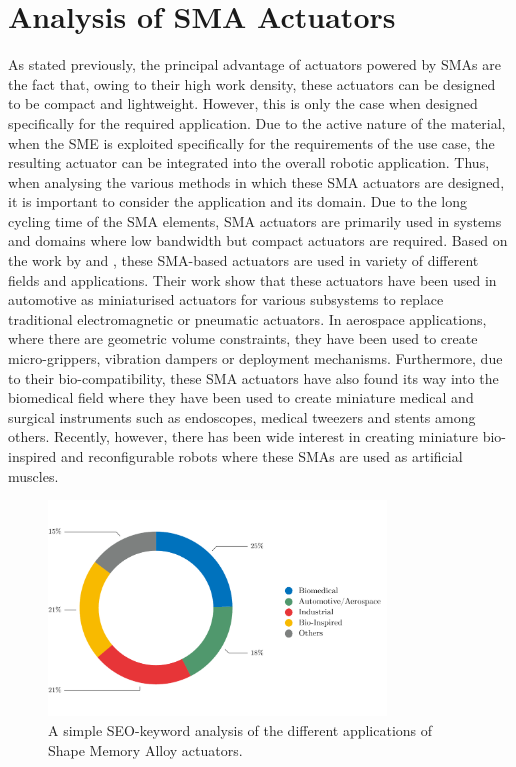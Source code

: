 \section{Analysis of SMA Actuators}
As stated previously, the principal advantage of actuators powered by SMAs are the fact that, owing to their high work density, these actuators can be designed to be compact and lightweight. However, this is only the case when designed specifically for the required application. Due to the active nature of the material, when the SME is exploited specifically for the requirements of the use case, the resulting actuator can be integrated into the overall robotic application. Thus, when analysing the various methods in which these SMA actuators are designed, it is important to consider the application and its domain. Due to the long cycling time of the SMA elements, SMA actuators are primarily used in systems and domains where low bandwidth but compact actuators are required. Based on the work by \cite{mohdjaniReviewShapeMemory2014} and \cite{sreekumarCriticalReviewCurrent2007}, these SMA-based actuators are used in variety of different fields and applications. Their work show that these actuators have been used in automotive as miniaturised actuators for various subsystems to replace traditional electromagnetic or pneumatic actuators. In aerospace applications, where there are geometric volume constraints, they have been used to create micro-grippers, vibration dampers or deployment mechanisms. Furthermore, due to their bio-compatibility, these SMA actuators have also found its way into the biomedical field where they have been used to create miniature medical and surgical instruments such as endoscopes, medical tweezers and stents among others. Recently, however, there has been wide interest in creating miniature bio-inspired and reconfigurable robots where these SMAs are used as artificial muscles.

\begin{figure}[hbt!]
    \centering
    \includegraphics[width=0.8\textwidth]{images/chap1/domain-donut-chart.pdf}
    \caption{A simple SEO-keyword analysis of the different applications of Shape Memory Alloy actuators.}
    \label{fig:domain-donut-chart}
\end{figure}

